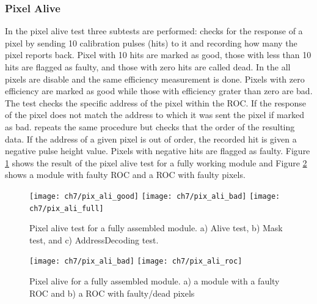 \subsubsection{Pixel Alive}
In the pixel alive test three subtests are performed:  checks for the response of a pixel by sending 10 calibration pulses (hits) to it and recording how many the pixel reports back. Pixel with 10 hits are marked as good, those with less than 10 hits are flagged as faulty, and those with zero hits are called dead. In the  all pixels are disable and the same efficiency measurement is done. Pixels with zero efficiency are marked as good while those with efficiency grater than zero are bad. The  test checks the specific address of the pixel within the ROC. If the response of the pixel does not match the address to which it was sent the pixel if marked as bad. repeats the same procedure but checks that the order of the resulting data. If the address of a given pixel is out
of order, the recorded hit is given a negative pulse height value. Pixels with negative
hits are flagged as faulty. Figure \ref{fig:pix_ali} shows the result of the pixel alive test for a fully working module and Figure \ref{fig:pix_ali_bad} shows a module with faulty ROC and a ROC with faulty pixels. 

\begin{figure}[!h]
  \centering
   \texttt{[image: ch7/pix\_ali\_good]}
   \texttt{[image: ch7/pix\_ali\_bad]}
   \texttt{[image: ch7/pix\_ali\_full]}
  \caption[Pixel alive test]{Pixel alive test for a fully assembled module. a) Alive test, b) Mask test, and c) AddressDecoding test.{}}\label{fig:pix_ali}
\end{figure}

\begin{figure}[!h]
  \centering
   \texttt{[image: ch7/pix\_ali\_bad]}
   \texttt{[image: ch7/pix\_ali\_roc]}
  \caption[Faulty pixel alive test]{Pixel alive for a fully assembled module. a) a module with a faulty ROC and b) a ROC with faulty/dead pixels}\label{fig:pix_ali_bad}
\end{figure}

